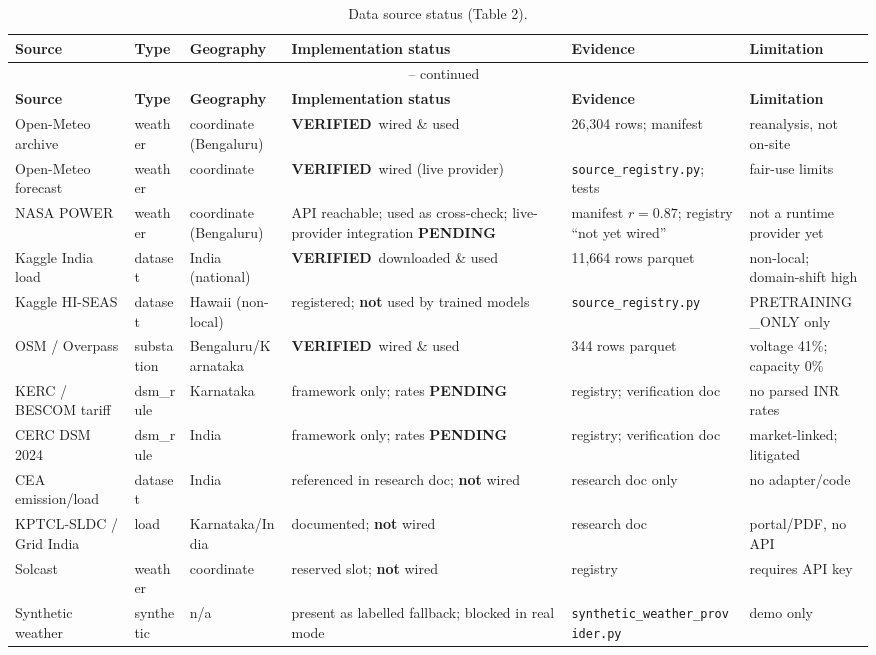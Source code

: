 \documentclass[11pt,a4paper]{article}
\newcommand{\stV}{\textcolor{cok}{\textbf{VERIFIED}}}
\newcommand{\stPend}{\textcolor{cpart}{\textbf{PENDING}}}
\newcommand{\code}[1]{\texttt{\small #1}}
\begin{document}
\begin{footnotesize}
\begin{longtable}{@{}p{2.7cm}p{1.5cm}p{2.0cm}p{3.0cm}p{2.2cm}p{2.4cm}@{}}
\caption{Data source status (Table 2).}\label{tab:sources}\\
\toprule
\textbf{Source} & \textbf{Type} & \textbf{Geography} & \textbf{Implementation status} & \textbf{Evidence} & \textbf{Limitation}\\
\midrule
\endfirsthead
\multicolumn{6}{c}{\tablename\ \thetable{} -- continued}\\
\toprule
\textbf{Source} & \textbf{Type} & \textbf{Geography} & \textbf{Implementation status} & \textbf{Evidence} & \textbf{Limitation}\\
\midrule
\endhead
\bottomrule
\endfoot
Open-Meteo archive & weather & coordinate (Bengaluru) & \stV\ wired \& used & 26{,}304 rows; manifest & reanalysis, not on-site\\
Open-Meteo forecast & weather & coordinate & \stV\ wired (live provider) & \code{source\_registry.py}; tests & fair-use limits\\
NASA POWER & weather & coordinate (Bengaluru) & API reachable; used as cross-check; live-provider integration \stPend & manifest $r=0.87$; registry ``not yet wired'' & not a runtime provider yet\\
Kaggle India load & dataset & India (national) & \stV\ downloaded \& used & 11{,}664 rows parquet & non-local; domain-shift high\\
Kaggle HI-SEAS & dataset & Hawaii (non-local) & registered; \textbf{not} used by trained models & \code{source\_registry.py} & PRETRAINING\_ONLY only\\
OSM / Overpass & substation & Bengaluru/Karnataka & \stV\ wired \& used & 344 rows parquet & voltage 41\%; capacity 0\%\\
KERC / BESCOM tariff & dsm\_rule & Karnataka & framework only; rates \stPend & registry; verification doc & no parsed INR rates\\
CERC DSM 2024 & dsm\_rule & India & framework only; rates \stPend & registry; verification doc & market-linked; litigated\\
CEA emission/load & dataset & India & referenced in research doc; \textbf{not} wired & research doc only & no adapter/code\\
KPTCL-SLDC / Grid India & load & Karnataka/India & documented; \textbf{not} wired & research doc & portal/PDF, no API\\
Solcast & weather & coordinate & reserved slot; \textbf{not} wired & registry & requires API key\\
Synthetic weather & synthetic & n/a & present as labelled fallback; blocked in real mode & \code{synthetic\_weather\_provider.py} & demo only\\
\end{longtable}
\end{footnotesize}
\end{document}
